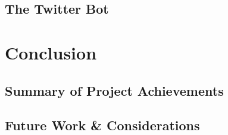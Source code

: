 \documentclass[11pt, twoside, reqno]{book}
\begin{document}
\section{The Twitter Bot}
\label{the_twitter_bot}

\chapter{Conclusion}
\label{conclusion}

\section{Summary of Project Achievements}
\label{summary}

\section{Future Work \& Considerations}
\label{future_work_and_considerations}
\end{document}
